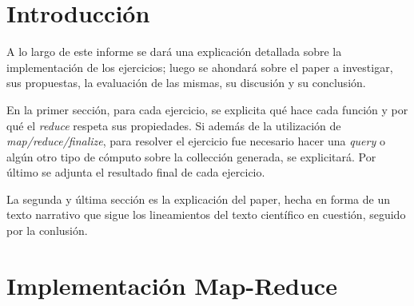 \documentclass[a4paper]{article}
\begin{document}

\thispagestyle{empty}

\maketitle
\newpage

\thispagestyle{empty}
\vfill
\thispagestyle{empty}
\vspace{1.5cm}
\tableofcontents
\newpage


\newpage
\section{Introducción}
A lo largo de este informe se dará una explicación detallada sobre la
implementación de los ejercicios; luego se ahondará sobre el paper a
investigar, sus propuestas, la evaluación de las mismas, su discusión y su
conclusión.

En la primer sección, para cada ejercicio, se explicita qué hace cada función y
por qué el \textit{reduce} respeta sus propiedades. Si además de la utilización
de \textit{map/reduce/finalize}, para resolver el ejercicio fue necesario hacer
una \textit{query} o algún otro tipo de cómputo sobre la collección generada,
se explicitará. Por último se adjunta el resultado final de cada ejercicio.

La segunda y última sección es la explicación del paper, hecha en forma de un texto
narrativo que sigue los lineamientos del texto científico en cuestión, seguido
por la conlusión.

\newpage
\section{Implementación Map-Reduce}
\end{document}
